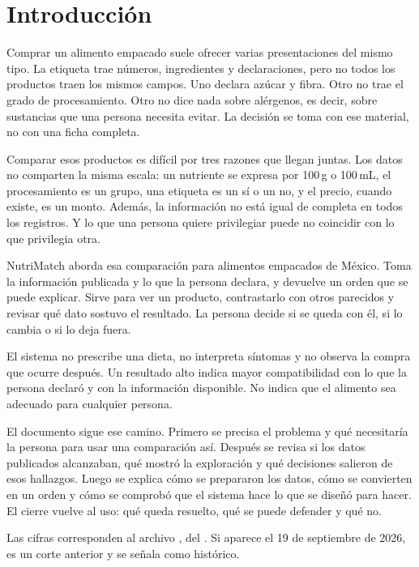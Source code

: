 \section{Introducción}

Comprar un alimento empacado suele ofrecer varias presentaciones del mismo tipo. La etiqueta trae números, ingredientes y declaraciones, pero no todos los productos traen los mismos campos. Uno declara azúcar y fibra. Otro no trae el grado de procesamiento. Otro no dice nada sobre alérgenos, es decir, sobre sustancias que una persona necesita evitar. La decisión se toma con ese material, no con una ficha completa.

Comparar esos productos es difícil por tres razones que llegan juntas. Los datos no comparten la misma escala: un nutriente se expresa por 100\,g o 100\,mL, el procesamiento es un grupo, una etiqueta es un sí o un no, y el precio, cuando existe, es un monto. Además, la información no está igual de completa en todos los registros. Y lo que una persona quiere privilegiar puede no coincidir con lo que privilegia otra.

NutriMatch aborda esa comparación para alimentos empacados de México. Toma la información publicada y lo que la persona declara, y devuelve un orden que se puede explicar. Sirve para ver un producto, contrastarlo con otros parecidos y revisar qué dato sostuvo el resultado. La persona decide si se queda con él, si lo cambia o si lo deja fuera.

El sistema no prescribe una dieta, no interpreta síntomas y no observa la compra que ocurre después. Un resultado alto indica mayor compatibilidad con lo que la persona declaró y con la información disponible. No indica que el alimento sea adecuado para cualquier persona.

El documento sigue ese camino. Primero se precisa el problema y qué necesitaría la persona para usar una comparación así. Después se revisa si los datos publicados alcanzaban, qué mostró la exploración y qué decisiones salieron de esos hallazgos. Luego se explica cómo se prepararon los datos, cómo se convierten en un orden y cómo se comprobó que el sistema hace lo que se diseñó para hacer. El cierre vuelve al uso: qué queda resuelto, qué se puede defender y qué no.

Las cifras corresponden al archivo \archivo, del \corte. Si aparece el 19 de septiembre de 2026, es un corte anterior y se señala como histórico.
